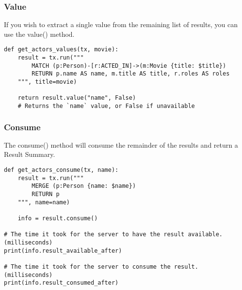 \begin{frame}[fragile]\frametitle{Value}

If you wish to extract a single value from the remaining list of results, you can use the value() method.

\begin{lstlisting}
def get_actors_values(tx, movie):
    result = tx.run("""
        MATCH (p:Person)-[r:ACTED_IN]->(m:Movie {title: $title})
        RETURN p.name AS name, m.title AS title, r.roles AS roles
    """, title=movie)

    return result.value("name", False)
    # Returns the `name` value, or False if unavailable
\end{lstlisting}

\end{frame}

\begin{frame}[fragile]\frametitle{Consume}

The consume() method will consume the remainder of the results and return a Result Summary.

\begin{lstlisting}
def get_actors_consume(tx, name):
    result = tx.run("""
        MERGE (p:Person {name: $name})
        RETURN p
    """, name=name)

    info = result.consume()
		
# The time it took for the server to have the result available. (milliseconds)
print(info.result_available_after)

# The time it took for the server to consume the result. (milliseconds)
print(info.result_consumed_after)		
\end{lstlisting}

\end{frame}

